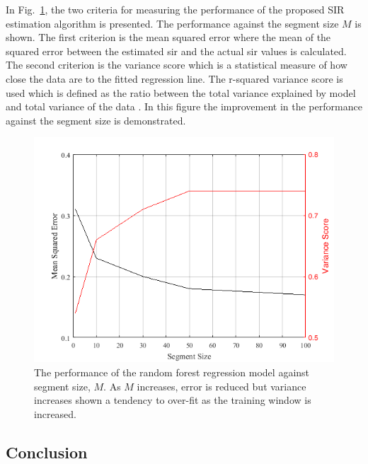 In Fig.~\ref{ftml-conf:fig:prediction-error}, the two criteria for measuring the performance of the proposed SIR estimation algorithm is presented. The performance against the segment size $M$ is shown. The first criterion is the mean squared error where the mean of the squared error between the estimated \gls{sir} and the actual \gls{sir} values is calculated. The second criterion is the variance score which is a statistical measure of how close the data are to the fitted regression line. The r-squared variance score is used which is defined as the ratio between the total variance explained by model and total variance of the data \cite{r-squared}. In this figure the improvement in the performance against the segment size is demonstrated. 

\begin{figure}[tbp]
 \centering
 \includegraphics[width=0.75\columnwidth]{./chapter-ftml/plots/prediction-error}
 \caption{The performance of the random forest regression model against segment size, $M$.  As $M$ increases, error is reduced but variance increases shown a tendency to over-fit as the training window is increased. }
 \label{ftml-conf:fig:prediction-error}
\end{figure}

\subsection{Conclusion}\label{ftml-conf:sec:conclusion}

